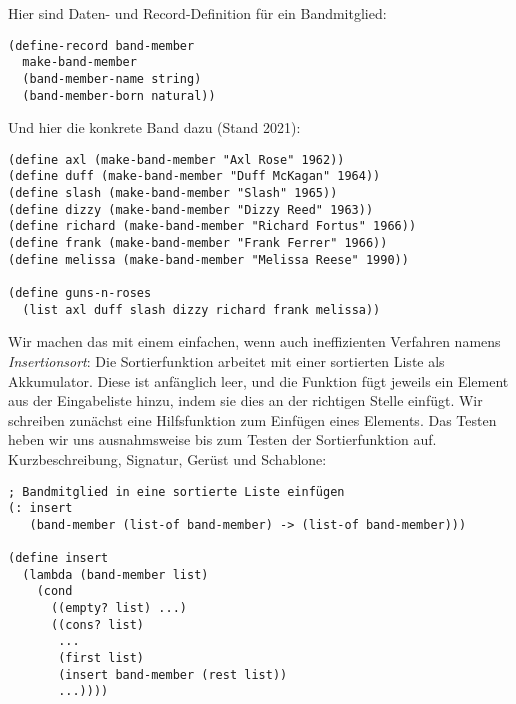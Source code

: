Hier sind Daten- und Record-Definition für ein Bandmitglied:
%
\begin{lstlisting}
(define-record band-member
  make-band-member
  (band-member-name string)
  (band-member-born natural))
\end{lstlisting}
%
Und hier die konkrete Band dazu (Stand 2021):
%
\begin{lstlisting}
(define axl (make-band-member "Axl Rose" 1962))
(define duff (make-band-member "Duff McKagan" 1964))
(define slash (make-band-member "Slash" 1965))
(define dizzy (make-band-member "Dizzy Reed" 1963))
(define richard (make-band-member "Richard Fortus" 1966))
(define frank (make-band-member "Frank Ferrer" 1966))
(define melissa (make-band-member "Melissa Reese" 1990))

(define guns-n-roses
  (list axl duff slash dizzy richard frank melissa))
\end{lstlisting}
%
Wir machen das mit einem
einfachen, wenn auch ineffizienten Verfahren namens
\textit{Insertionsort}:
Die Sortierfunktion arbeitet mit einer sortierten Liste als
Akkumulator.  Diese ist anfänglich leer, und die Funktion fügt jeweils
ein Element aus der Eingabeliste hinzu, indem sie dies an der
richtigen Stelle einfügt.
%
%
%
Wir schreiben zunächst eine Hilfsfunktion zum Einfügen eines Elements.
Das Testen heben wir uns ausnahmsweise bis zum Testen der
Sortierfunktion auf.  Kurzbeschreibung,
Signatur, Gerüst und Schablone:
%
\begin{lstlisting}
; Bandmitglied in eine sortierte Liste einfügen
(: insert
   (band-member (list-of band-member) -> (list-of band-member)))

(define insert
  (lambda (band-member list)
    (cond
      ((empty? list) ...)
      ((cons? list)
       ...
       (first list)
       (insert band-member (rest list))
       ...))))
\end{lstlisting}
